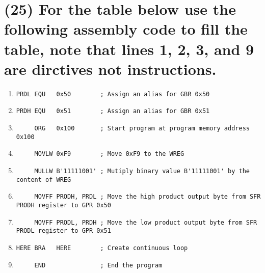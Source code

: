 \documentclass{article}
\begin{document}
\section{(25) For the table below use the following assembly code to fill the table, note that lines 1, 2, 3, and 9 are dirctives not instructions.}
\begin{enumerate}
  \item \begin{verbatim}PRDL EQU   0x50        ; Assign an alias for GBR 0x50\end{verbatim}
  \item \begin{verbatim}PRDH EQU   0x51        ; Assign an alias for GBR 0x51\end{verbatim}
  \item \begin{verbatim}     ORG   0x100       ; Start program at program memory address 0x100\end{verbatim}
  \item \begin{verbatim}     MOVLW 0xF9        ; Move 0xF9 to the WREG\end{verbatim}
  \item \begin{verbatim}     MULLW B'11111001' ; Mutiply binary value B'11111001' by the content of WREG\end{verbatim}
  \item \begin{verbatim}     MOVFF PRODH, PRDL ; Move the high product output byte from SFR PRODH register to GPR 0x50\end{verbatim}
  \item \begin{verbatim}     MOVFF PRODL, PRDH ; Move the low product output byte from SFR PRODL register to GPR 0x51\end{verbatim}
  \item \begin{verbatim}HERE BRA   HERE        ; Create continuous loop\end{verbatim}
  \item \begin{verbatim}     END               ; End the program\end{verbatim}
\end{enumerate}
\end{document}
